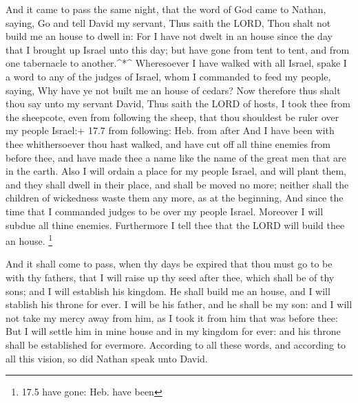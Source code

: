  And it came to pass the same night, that the word of God
came to Nathan, saying,  Go and tell David my servant, Thus
saith the LORD, Thou shalt not build me an house to dwell in:
 For I have not dwelt in an house since the day that I
brought up Israel unto this day; but have gone from tent to tent, and
from one tabernacle to another.\^{}*\^{}  Wheresoever I have
walked with all Israel, spake I a word to any of the judges of Israel,
whom I commanded to feed my people, saying, Why have ye not built me an
house of cedars?  Now therefore thus shalt thou say unto my
servant David, Thus saith the LORD of hosts, I took thee from the
sheepcote, even from following the sheep, that thou shouldest be ruler
over my people Israel:+ 17.7 from following: Heb. from after
 And I have been with thee whithersoever thou hast walked,
and have cut off all thine enemies from before thee, and have made thee
a name like the name of the great men that are in the earth.
 Also I will ordain a place for my people Israel, and will
plant them, and they shall dwell in their place, and shall be moved no
more; neither shall the children of wickedness waste them any more, as
at the beginning,  And since the time that I commanded
judges to be over my people Israel. Moreover I will subdue all thine
enemies. Furthermore I tell thee that the LORD will build thee an house.
\footnote{17.5 have gone: Heb. have been}

 And it shall come to pass, when thy days be expired that
thou must go to be with thy fathers, that I will raise up thy seed after
thee, which shall be of thy sons; and I will establish his kingdom.
 He shall build me an house, and I will stablish his throne
for ever.  I will be his father, and he shall be my son:
and I will not take my mercy away from him, as I took it from him that
was before thee:  But I will settle him in mine house and
in my kingdom for ever: and his throne shall be established for
evermore.  According to all these words, and according to
all this vision, so did Nathan speak unto David.

